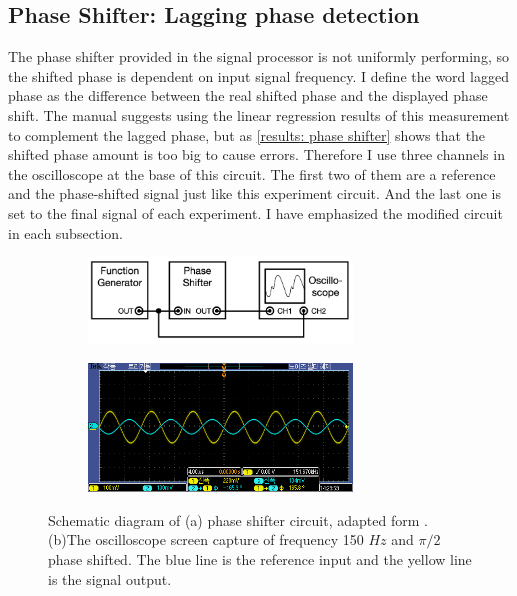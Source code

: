 \documentclass{article}
\begin{document}
\subsection{Phase Shifter: Lagging phase detection}
The phase shifter provided in the signal processor is not uniformly performing, so the shifted phase is dependent on input signal frequency.
I define the word lagged phase as the difference between the real shifted phase and the displayed phase shift.
The manual suggests using the linear regression results of this measurement to complement the lagged phase, but as \ref{results: phase shifter} shows that the shifted phase amount is too big to cause errors.
Therefore I use three channels in the oscilloscope at the base of this circuit.
The first two of them are a reference and the phase-shifted signal just like this experiment circuit.
And the last one is set to the final signal of each experiment.
I have emphasized the modified circuit in each subsection.
\begin{figure}[ht]
    \centering
    \begin{subfigure}[b]{7cm}
        \centering
        \includegraphics[width=7cm]{../results/phase_shifter_circuit.png}
        \caption{}
    \end{subfigure}
    \hfill
    \begin{subfigure}[b]{7cm}
        \centering
        \includegraphics[width=7cm]{../raw_data/TEK00306.PNG}
        \caption{}
    \end{subfigure}
    \hfill
    \caption{Schematic diagram of (a) phase shifter circuit, adapted form  \cite{signal_processor}.
    (b)The oscilloscope screen capture of frequency 150 $Hz$ and $\pi/2$ phase shifted.
    The blue line is the reference input and the yellow line is the signal output.}
    \label{fig: phase_shifter_circuit}
  \end{figure}
\end{document}
